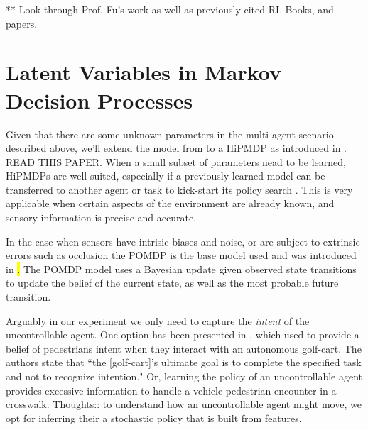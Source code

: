     ** Look through Prof. Fu's work as well as previously cited RL-Books, and papers.

\section{Latent Variables in Markov Decision Processes}\label{sec:literature_hipmdp}


    Given that there are some unknown parameters in the multi-agent scenario described above, we'll extend the model
    from  to a \ac{HiPMDP} as introduced in \colorbox{yellow}{\cite{doshi2016hidden}}. READ THIS PAPER.  When a
    small subset of parameters nead to be learned, \ac{HiPMDP}s are well suited, especially if a previously learned
    model can be transferred to another agent or task to kick-start its policy search
    \colorbox{yellow}{\cite{killian2017robust}}. This is very applicable when certain aspects of the environment are
    already known, and sensory information is precise and accurate.

    In the case when sensors have intrisic biases and noise, or are subject to extrinsic errors such as occlusion the
    \ac{POMDP} is the base model used and was introduced in \colorbox{yellow}{\cite{kaelbling1998planning}.} The
    \ac{POMDP} model uses a Bayesian update given observed state transitions to update the belief of the current state,
    as well as the most probable future transition.

    Arguably in our experiment we only need to capture the \textit{intent} of the uncontrollable agent. One option has
    been presented in \cite{bandyopadhyay2013intention}, which used  to provide a belief of pedestrians
    intent when they interact with an autonomous golf-cart.  The authors state that ``the [golf-cart]'s ultimate goal is
    to complete the specified task and not to recognize intention." Or, learning the policy of an uncontrollable agent
    provides excessive information to handle a vehicle-pedestrian encounter in a crosswalk.  Thoughts:: to understand
    how an uncontrollable agent might move, we opt for inferring their a stochastic policy that is built from features.

